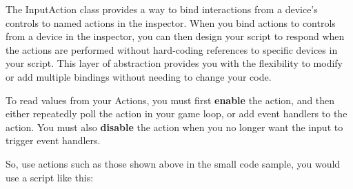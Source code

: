 The Input\+Action class provides a way to bind interactions from a device’s controls to named actions in the inspector. When you bind actions to controls from a device in the inspector, you can then design your script to respond when the actions are performed without hard-\/coding references to specific devices in your script. This layer of abstraction provides you with the flexibility to modify or add multiple bindings without needing to change your code.

To read values from your Actions, you must first {\bfseries{enable}} the action, and then either repeatedly poll the action in your game loop, or add event handlers to the action. You must also {\bfseries{disable}} the action when you no longer want the input to trigger event handlers.

So, use actions such as those shown above in the small code sample, you would use a script like this\+:


\begin{DoxyCode}{0}
\DoxyCodeLine{}
\DoxyCodeLine{}
\DoxyCodeLine{\{}
\DoxyCodeLine{}
\DoxyCodeLine{\ \ \ \ \{}
\DoxyCodeLine{\ \ \ \ \}}
\DoxyCodeLine{}
\DoxyCodeLine{\ \ \ \ \{}
\DoxyCodeLine{\ \ \ \ \}}
\DoxyCodeLine{}
\DoxyCodeLine{\ \ \ \ \{}
\DoxyCodeLine{\ \ \ \ \}}
\DoxyCodeLine{}
\DoxyCodeLine{}
\DoxyCodeLine{\ \ \ \ \{}
\DoxyCodeLine{\ \ \ \ \}}
\DoxyCodeLine{}
\DoxyCodeLine{\ \ \ \ \{}
\DoxyCodeLine{\ \ \ \ \}}
\DoxyCodeLine{\}}

\end{DoxyCode}


